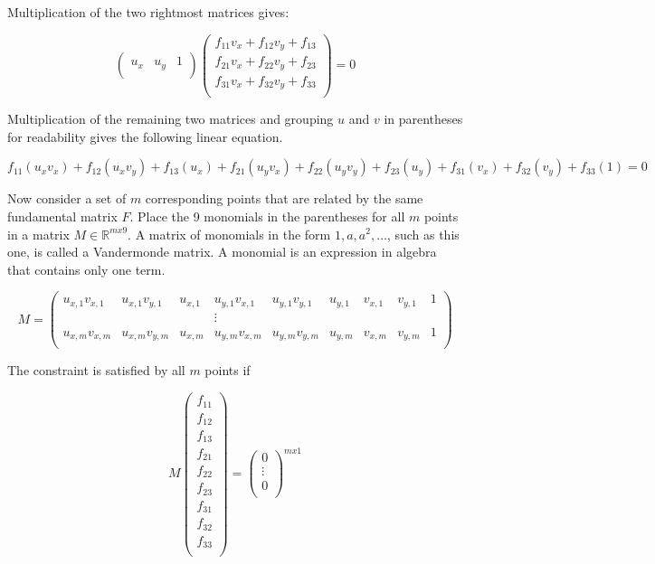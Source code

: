 Multiplication of the two rightmost matrices gives:

\[
\begin{pmatrix}
u_x & u_y & 1 \\
\end{pmatrix}
\begin{pmatrix}
f_{11} v_x + f_{12} v_y + f_{13} \\
f_{21} v_x + f_{22} v_y + f_{23} \\
f_{31} v_x + f_{32} v_y + f_{33} \\
\end{pmatrix}
= 0
\]

Multiplication of the remaining two matrices and grouping $u$ and $v$ in parentheses for readability gives the following linear equation.

\[
f_{11} (u_x v_x) + f_{12} (u_x v_y) + f_{13} (u_x) +
f_{21} (u_y v_x) + f_{22} (u_y v_y) + f_{23} (u_y) +
f_{31} (v_x) + f_{32} (v_y) + f_{33} (1)
= 0
\]

Now consider a set of $m$ corresponding points that are related by the same fundamental matrix $F$. Place the 9 monomials in the parentheses for all $m$ points in a matrix $ M \in \mathbb{R}^{mx9} $. A matrix of monomials in the form $1, a, a^2, \dots$, such as this one, is called a Vandermonde matrix. A monomial is an expression in algebra that contains only one term.

\[
M=
\begin{pmatrix}
u_{x,1} v_{x,1} & u_{x,1} v_{y,1} & u_{x,1} & u_{y,1} v_{x,1} & u_{y,1} v_{y,1} & u_{y,1} & v_{x,1} & v_{y,1} & 1 \\
 & & & \vdots & & & & & \\
u_{x,m} v_{x,m} & u_{x,m} v_{y,m} & u_{x,m} & u_{y,m} v_{x,m} & u_{y,m} v_{y,m} & u_{y,m} & v_{x,m} & v_{y,m} & 1 \\
\end{pmatrix}
\]

The constraint is satisfied by all $m$ points if

\[
M
\begin{pmatrix}
f_{11} \\
f_{12} \\
f_{13} \\
f_{21} \\
f_{22} \\
f_{23} \\
f_{31} \\
f_{32} \\
f_{33} \\
\end{pmatrix}
=
\begin{pmatrix}
0 \\
\vdots \\
0 \\
\end{pmatrix}
^{mx1}
\]

